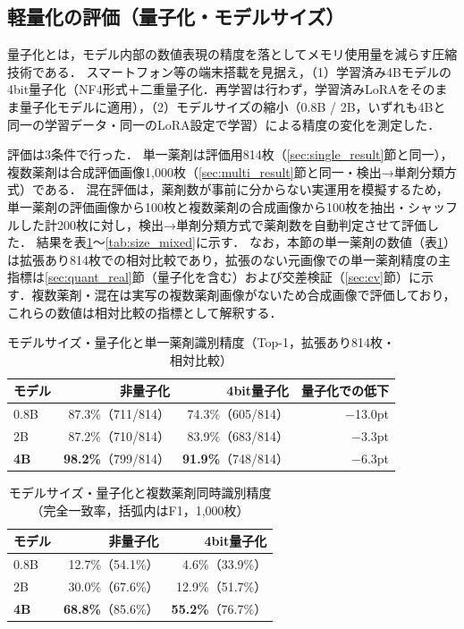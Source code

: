 \documentclass[dvipdfmx]{jsarticle}
\begin{document}
\subsection{軽量化の評価（量子化・モデルサイズ）}\label{sec:light}

量子化とは，モデル内部の数値表現の精度を落としてメモリ使用量を減らす圧縮技術である．
スマートフォン等の端末搭載を見据え，（1）学習済み4Bモデルの4bit量子化（NF4形式＋二重量子化．再学習は行わず，学習済みLoRAをそのまま量子化モデルに適用），（2）モデルサイズの縮小（0.8B / 2B，いずれも4Bと同一の学習データ・同一のLoRA設定で学習）による精度の変化を測定した．

評価は3条件で行った．
単一薬剤は評価用814枚（\ref{sec:single_result}節と同一），複数薬剤は合成評価画像1,000枚（\ref{sec:multi_result}節と同一・検出→単剤分類方式）である．
混在評価は，薬剤数が事前に分からない実運用を模擬するため，単一薬剤の評価画像から100枚と複数薬剤の合成画像から100枚を抽出・シャッフルした計200枚に対し，検出→単剤分類方式で薬剤数を自動判定させて評価した．
結果を表\ref{tab:size_single}〜\ref{tab:size_mixed}に示す．
なお，本節の単一薬剤の数値（表\ref{tab:size_single}）は拡張あり814枚での相対比較であり，拡張のない元画像での単一薬剤精度の主指標は\ref{sec:quant_real}節（量子化を含む）および交差検証（\ref{sec:cv}節）に示す．複数薬剤・混在は実写の複数薬剤画像がないため合成画像で評価しており，これらの数値は相対比較の指標として解釈する．

\begin{table}[htbp]
\centering
\caption{モデルサイズ・量子化と単一薬剤識別精度（Top-1，拡張あり814枚・相対比較）}
\label{tab:size_single}
\begin{tabular}{lrrr}
\hline
モデル & 非量子化 & 4bit量子化 & 量子化での低下 \\
\hline
0.8B & 87.3\%（711/814） & 74.3\%（605/814） & $-$13.0pt \\
2B & 87.2\%（710/814） & 83.9\%（683/814） & $-$3.3pt \\
\textbf{4B} & \textbf{98.2\%}（799/814） & \textbf{91.9\%}（748/814） & $-$6.3pt \\
\hline
\end{tabular}
\end{table}

\begin{table}[htbp]
\centering
\caption{モデルサイズ・量子化と複数薬剤同時識別精度（完全一致率，括弧内はF1，1,000枚）}
\label{tab:size_multi}
\begin{tabular}{lrr}
\hline
モデル & 非量子化 & 4bit量子化 \\
\hline
0.8B & 12.7\%（54.1\%） & 4.6\%（33.9\%） \\
2B & 30.0\%（67.6\%） & 12.9\%（51.7\%） \\
\textbf{4B} & \textbf{68.8\%}（85.6\%） & \textbf{55.2\%}（76.7\%） \\
\hline
\end{tabular}
\end{table}
\end{document}

